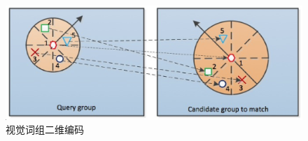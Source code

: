 \begin{figure}
\centering\includegraphics[width=15.00cm]{imgs/ch3/visual_group}
\caption{视觉词组二维编码}
\label{fig:visual_group}
\end{figure}


\ifx\usechapbib\empty
\nocite{BSTcontrol}


\fi
